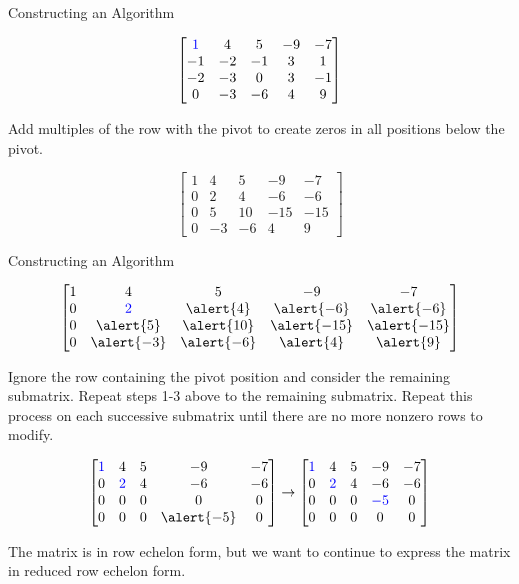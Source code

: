 \documentclass[xcolor=dvipsnames,aspectratio=169,t]{beamer}
\begin{document}
\begin{frame}{Constructing an Algorithm}

  \[ \begin{bmatrix}   \textcolor{blue}{1} & 4 & 5 & -9 & -7\\
  -1 & -2 & -1 & 3 & 1 \\
  -2 & -3 & 0 & 3 & -1\\
0 & -3 & -6 & 4 & 9  \end{bmatrix} \]

  
  \bb
  \setcounter{enumi}{2}
 \ii Add multiples of the row with the pivot to create zeros in all positions below the pivot.

 \[ \begin{bmatrix}   1 & 4 & 5 & -9 & -7\\
  0 & 2 & 4 & -6 & -6 \\
  0 & 5 & 10 & -15 & -15\\
0 & -3 & -6 & 4 & 9  \end{bmatrix} \]

 \ee

 \end{frame}

\begin{frame}{Constructing an Algorithm}

  {\small
 \[ \begin{bmatrix}   1 & 4 & 5 & -9 & -7\\
  0 & \colorb{2} & \alert{4} & \alert{-6} & \alert{-6} \\
  0 & \alert{5} & \alert{10} & \alert{-15} & \alert{-15}\\
0 & \alert{-3} & \alert{-6} & \alert{4} & \alert{9}  \end{bmatrix} \] }

 \bb
 \setcounter{enumi}{3}

\ii Ignore the row containing the pivot position and consider the remaining submatrix.
  Repeat steps 1-3 above to the remaining submatrix.
  Repeat this process on each successive submatrix until there are no more nonzero rows to modify.

{\small 
\[ \begin{bmatrix}   \colorb{1} & 4 & 5 & -9 & -7\\
  0 & \colorb{2} & 4 & -6 & -6 \\
  0 & 0 & 0 & 0 & 0\\
  0 & 0 & 0 & \alert{-5} & 0  \end{bmatrix}
\rightarrow
\begin{bmatrix}   \colorb{1} & 4 & 5 & -9 & -7\\
  0 & \colorb{2} & 4 & -6 & -6 \\
  0 & 0 & 0 & \colorb{-5} & 0 \\
  0 & 0 & 0 & 0 & 0 \end{bmatrix}
\] }

\ee

The matrix is in row echelon form, but we want to continue to express the matrix in reduced row echelon form.
\end{frame}
\end{document}
